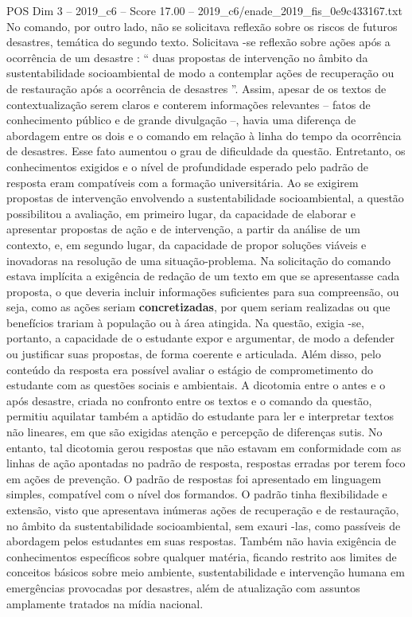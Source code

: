 \begin{textsample}{POS Dim 3 – 2019\_c6 – Score 17.00 – 2019\_c6/enade\_2019\_fis\_0e9c433167.txt}
No comando, por outro lado, não se solicitava reflexão sobre os riscos de futuros desastres, temática do segundo texto.
Solicitava -se reflexão sobre ações após a ocorrência de um desastre : “ duas propostas de intervenção no âmbito da sustentabilidade socioambiental de modo a contemplar ações de recuperação ou de restauração após a ocorrência de desastres ”.
Assim, apesar de os textos de contextualização serem claros e conterem informações relevantes – fatos de conhecimento público e de grande divulgação –, havia uma diferença de abordagem entre os dois e o comando em relação à linha do tempo da ocorrência de desastres.
Esse fato aumentou o grau de dificuldade da questão.
Entretanto, os conhecimentos exigidos e o nível de profundidade esperado pelo padrão de resposta eram compatíveis com a formação universitária.
Ao se exigirem propostas de intervenção envolvendo a sustentabilidade socioambiental, a questão possibilitou a avaliação, em primeiro lugar, da capacidade de elaborar e apresentar propostas de ação e de intervenção, a partir da análise de um contexto, e, em segundo lugar, da capacidade de propor soluções viáveis e inovadoras na resolução de uma situação-problema.
Na solicitação do comando estava implícita a exigência de redação de um texto em que se apresentasse cada proposta, o que deveria incluir informações suficientes para sua compreensão, ou seja, como as ações seriam \textbf{concretizadas}, por quem seriam realizadas ou que benefícios trariam à população ou à área atingida.
Na questão, exigia -se, portanto, a capacidade de o estudante expor e argumentar, de modo a defender ou justificar suas propostas, de forma coerente e articulada.
Além disso, pelo conteúdo da resposta era possível avaliar o estágio de comprometimento do estudante com as questões sociais e ambientais.
A dicotomia entre o antes e o após desastre, criada no confronto entre os textos e o comando da questão, permitiu aquilatar também a aptidão do estudante para ler e interpretar textos não lineares, em que são exigidas atenção e percepção de diferenças sutis.
No entanto, tal dicotomia gerou respostas que não estavam em conformidade com as linhas de ação apontadas no padrão de resposta, respostas erradas por terem foco em ações de prevenção.
O padrão de respostas foi apresentado em linguagem simples, compatível com o nível dos formandos.
O padrão tinha flexibilidade e extensão, visto que apresentava inúmeras ações de recuperação e de restauração, no âmbito da sustentabilidade socioambiental, sem exauri -las, como passíveis de abordagem pelos estudantes em suas respostas.
Também não havia exigência de conhecimentos específicos sobre qualquer matéria, ficando restrito aos limites de conceitos básicos sobre meio ambiente, sustentabilidade e intervenção humana em emergências provocadas por desastres, além de atualização com assuntos amplamente tratados na mídia nacional.

\end{textsample}
